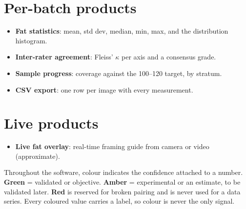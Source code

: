 \section{Per-batch products}

\begin{itemize}[leftmargin=1.3em,itemsep=3pt]
  \item \textbf{Fat statistics}: mean, std dev, median, min, max, and the
        distribution histogram.
  \item \textbf{Inter-rater agreement}: Fleiss' $\kappa$ per axis and a
        consensus grade.
  \item \textbf{Sample progress}: coverage against the 100--120 target, by
        stratum.
  \item \textbf{CSV export}: one row per image with every measurement.
\end{itemize}

\section{Live products}

\begin{itemize}[leftmargin=1.3em,itemsep=3pt]
  \item \textbf{Live fat overlay}: real-time framing guide from camera or
        video (approximate).
\end{itemize}

\begin{note}[title=Reading the colour code]
Throughout the software, colour indicates the confidence attached to a number.
\textbf{Green} = validated or objective. \textbf{Amber} = experimental or an
estimate, to be validated later. \textbf{Red} is reserved for broken pairing and
is never used for a data series. Every coloured value carries a label, so colour is
never the only signal.
\end{note}
